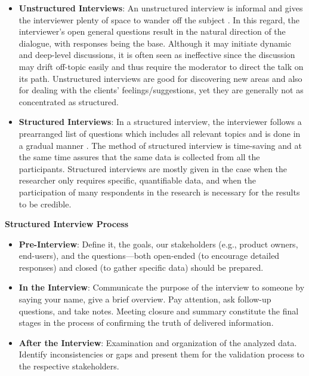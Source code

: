\documentclass[conference]{IEEEtran}
\begin{document}
\begin{itemize}
    \item \textbf{Unstructured Interviews}: An unstructured interview is informal and gives the interviewer plenty of space to wander off the subject \cite{cite8}. In this regard, the interviewer's open general questions result in the natural direction of the dialogue, with responses being the base. Although it may initiate dynamic and deep-level discussions, it is often seen as ineffective since the discussion may drift off-topic easily and thus require the moderator to direct the talk on its path. Unstructured interviews are good for discovering new areas and also for dealing with the clients' feelings/suggestions, yet they are generally not as concentrated as structured.
    \item \textbf{Structured Interviews}: In a structured interview, the interviewer follows a prearranged list of questions which includes all relevant topics and is done in a gradual manner \cite{cite8}. The method of structured interview is time-saving and at the same time assures that the same data is collected from all the participants. Structured interviews are mostly given in the case when the researcher only requires specific, quantifiable data, and when the participation of many respondents in the research is necessary for the results to be credible.
\end{itemize}

\textbf{Structured Interview Process}

\begin{itemize}
    \item \textbf{Pre-Interview}: Define it, the goals, our stakeholders (e.g., product owners, end-users), and the questions—both open-ended (to encourage detailed responses) and closed (to gather specific data) should be prepared.
    \item \textbf{In the Interview}: Communicate the purpose of the interview to someone by saying your name, give a brief overview. Pay attention, ask follow-up questions, and take notes. Meeting closure and summary constitute the final stages in the process of confirming the truth of delivered information.
    \item \textbf{After the Interview}: Examination and organization of the analyzed data. Identify inconsistencies or gaps and present them for the validation process to the respective stakeholders.
\end{itemize}
\end{document}
